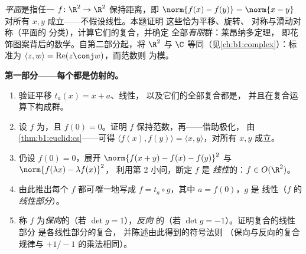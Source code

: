 \begin{problem}\label{pb:b1:euclid:1}
\emph{平面}是指任一 $f \colon \R^2 \to
\R^2$ 保持距离，即 $\norm{f(x) - f(y)} = \norm{x - y}$
对所有 $x, y$ 成立——不假设线性。本题证明
这些恰为平移、旋转、
对称与滑动对称（平面的
分类），计算它们的复合，并确定
全部\emph{有限}群：莱昂纳多定理，
即花饰图案背后的数学。自第二部分起，将 $\R^2$ 与
$\C$ 等同（见\cref{ch:b1:complex}）：标准为
$\langle z, w\rangle = \operatorname{Re}(z\conj w)$，而范数则
为模。

\medskip
\noindent\textbf{第一部分——每个都是仿射的。}
\begin{enumerate}
  \item 验证平移 $t_a(x) = x + a$、线性，
        以及它们的全部复合都是，
        并且在复合运算下构成群。
  \item 设 $f$ 为，且 $f(0) = 0$。证明 $f$
        保持范数，再——借助极化，
        由\cref{thm:b1:euclid:cs}——可得 $\langle f(x),
        f(y)\rangle = \langle x, y\rangle$，对所有 $x, y$ 成立。
  \item 仍设 $f(0) = 0$，展开 $\norm{f(x + y) - f(x) -
        f(y)}^2$ 与 $\norm{f(\lambda x) - \lambda f(x)}^2$，
        利用第 2 小问，断定 $f$ 是
        \emph{线性}的：$f \in O(\R^2)$。
  \item 由此推出每个 $f$ 都可\emph{唯一}地写成
        $f = t_a \circ g$，其中 $a = f(0)$，$g$ 是
        线性（$f$ 的\emph{线性部分}）。
  \item 称 $f$ 为\emph{保向}的（若 $\det g = 1$），\emph{反向}
        的（若 $\det g = -1$）。证明复合的线性部分
        是各线性部分的复合，
        并陈述由此得到的符号法则
        （保向与反向的复合规律与 $+1/-1$ 的乘法相同）。
\end{enumerate}


\end{problem}
